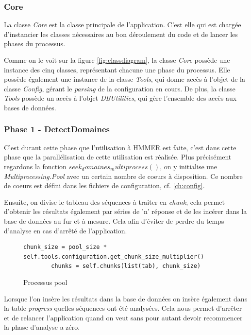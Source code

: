 \subsubsection{Core}
La classe \emph{Core} est la classe principale de l'application. C'est elle qui est chargée d'instancier les classes nécessaires au bon déroulement du code et de lancer les phases du processus.

Comme on le voit sur la figure \ref{fig:classdiagram}, la classe \emph{Core} possède une instance des cinq classes, représentant chacune une phase du processus. Elle possède également une instance de la classe \emph{Tools}, qui donne accès à l'objet de la classe \emph{Config}, gérant le \emph{parsing} de la configuration en cours. De plus, la classe \emph{Tools} possède un accès à l'objet \emph{DBUtilities}, qui gère l'ensemble des accès aux bases de données.

\subsubsection{Phase 1 - DetectDomaines}

C'est durant cette phase que l'utilisation à HMMER est faite, c'est dans cette phase que la parallélisation de cette utilisation est réalisée. Plus précisément regardons la fonction \emph{$seek_domaines_multiprocess()$}, on y initialise une \emph{Multiprocessing.Pool} avec un certain nombre de coeurs à disposition. Ce nombre de coeurs est défini dans les fichiers de configuration, cf. \ref{ch:config}.

Ensuite, on divise le tableau des séquences à traiter en \emph{chunk}, cela permet d'obtenir les résultats également par séries de 'n' réponse et de les incérer dans la base de données au fur et à mesure. Cela afin d'éviter de perdre du temps d'analyse en cas d'arrêté de l'application.

\begin{figure}[H] 
\centering 
\lstset{language=python}
\begin{lstlisting}[frame=single]
chunk_size = pool_size * self.tools.configuration.get_chunk_size_multiplier()
        chunks = self.chunks(list(tab), chunk_size)
\end{lstlisting} 
\caption[Processus pool]{Processus pool}
\label{fig:processPool} 
\end{figure}

Lorsque l'on insère les résultats dans la base de données on insère également dans la table \emph{progress} quelles séquences ont été analysées. Cela nous permet d'arrêter et de relancer l'application quand on veut sans pour autant devoir recommencer la phase d'analyse a zéro.

